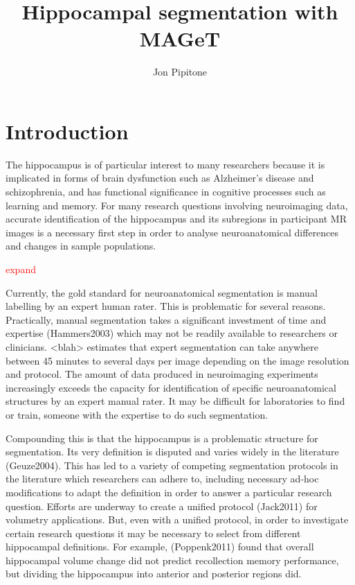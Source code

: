 \documentclass{article}\usepackage{graphicx, color}
\newcommand{\todo}[1]{
    \addcontentsline{tdo}{todo}{\protect{#1}}
    \textcolor{red}{#1}
}
\begin{document}
\title{Hippocampal segmentation with MAGeT}
\author{Jon Pipitone}
\maketitle

\section{Introduction}


The hippocampus is of particular interest to many researchers because it is implicated in forms of brain dysfunction such as Alzheimer's disease and schizophrenia, and has functional significance in cognitive processes such as learning and memory.  For many research questions involving neuroimaging data, accurate identification of the hippocampus and its subregions in participant MR images is a necessary first step in order to analyse neuroanatomical differences and changes in  sample populations.  \todo{expand}

Currently, the gold standard for neuroanatomical segmentation is manual labelling by an expert human rater.  This is problematic for several reasons.  Practically, manual segmentation takes a significant investment of time and expertise (Hammers2003) which may not be readily available to researchers or clinicians.  <blah> estimates that expert segmentation can take anywhere between 45 minutes to several days per image depending on the image resolution and protocol.  The amount of data produced in neuroimaging experiments increasingly exceeds the capacity for identification of specific neuroanatomical structures by an expert manual rater.  It may be difficult for laboratories to find or train, someone with the expertise to do such segmentation.  

Compounding this is that the hippocampus is a problematic structure for segmentation. Its very definition is disputed and varies widely in the literature (Geuze2004).  This has led to a variety of competing segmentation protocols in the literature which researchers can adhere to, including necessary ad-hoc modifications to adapt the definition in order to answer a particular research question.  Efforts are underway to create a unified protocol (Jack2011) for volumetry applications. But, even with a unified protocol, in order to investigate certain research questions it may be necessary to select from different hippocampal definitions. For example, (Poppenk2011) found that overall hippocampal volume change did not predict recollection memory performance, but dividing the hippocampus into anterior and posterior regions did. 
\end{document}

